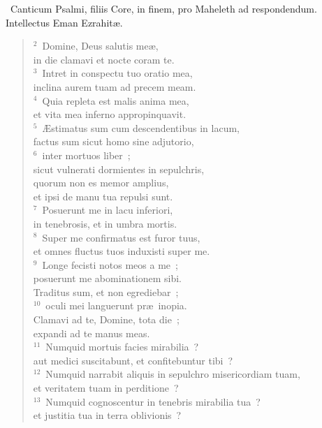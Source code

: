 ~\lettrine[lines=10,image=true,loversize=0.05,lraise=-0.03]{C}{}anticum Psalmi, filiis Core, in finem, pro Maheleth ad respondendum. Intellectus Eman Ezrahit\ae .
\begin{flushleft}\begin{verse}\vspace{6pt}${}^{2}$~Domine, Deus salutis me\ae ,\\ in die clamavi et nocte coram te.\\
${}^{3}$~Intret in conspectu tuo oratio mea,\\ inclina aurem tuam ad precem meam.\\
${}^{4}$~Quia repleta est malis anima mea,\\ et vita mea inferno appropinquavit.\\
${}^{5}$~\AE stimatus sum cum descendentibus in lacum,\\ factus sum sicut homo sine adjutorio,\\
${}^{6}$~inter mortuos liber~;\\ sicut vulnerati dormientes in sepulchris,\\ quorum non es memor amplius,\\ et ipsi de manu tua repulsi sunt.\\
${}^{7}$~Posuerunt me in lacu inferiori,\\ in tenebrosis, et in umbra mortis.\\
${}^{8}$~Super me confirmatus est furor tuus,\\ et omnes fluctus tuos induxisti super me.\\
${}^{9}$~Longe fecisti notos meos a me~;\\ posuerunt me abominationem sibi.\\ Traditus sum, et non egrediebar~;\\
${}^{10}$~oculi mei languerunt pr\ae\ inopia.\\ Clamavi ad te, Domine, tota die~;\\ expandi ad te manus meas.\\
${}^{11}$~Numquid mortuis facies mirabilia~?\\ aut medici suscitabunt, et confitebuntur tibi~?\\
${}^{12}$~Numquid narrabit aliquis in sepulchro misericordiam tuam,\\ et veritatem tuam in perditione~?\\
${}^{13}$~Numquid cognoscentur in tenebris mirabilia tua~?\\ et justitia tua in terra oblivionis~?\\

\end{verse}
\end{flushleft}

